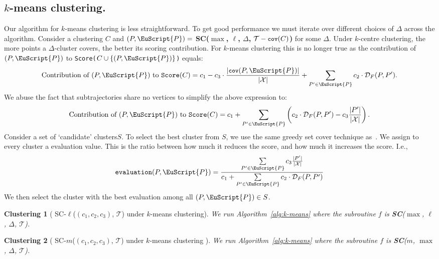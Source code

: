\documentclass[11pt]{article}
\newcommand{\fancy}[1]{\EuScript{#1}}
\newcommand{\Cov}{\texttt{\small cov}}
\newcommand{\fd}{\mathcal{D}_F}
\newcommand{\pathlet}{cluster\xspace}
\newcommand{\pathlets}{clusters\xspace}
\newtheorem{algodef}{Clustering}
\begin{document}
\subsection{\texorpdfstring{$k$-means clustering.}{k-means clustering} }
%
Our algorithm for $k$-means clustering is less straightforward. 
To get good performance we must iterate over different choices of $\Delta$ across the algorithm. Consider a clustering $C$ and $(P, {\fancy{P}})=$ \textbf{SC($\max$, $\ell$, $\Delta$, $\mathcal{T} - \Cov(C)$)} for some $\Delta$. 
Under $k$-centre clustering, the more points a $\Delta$-\pathlet covers, the better its scoring contribution. 
For $k$-means clustering this is no longer true as the contribution of $(P, {\fancy{P}})$ to \texttt{Score($C \cup \{ (P, {\fancy{P}})\}$)} equals:
%
\[
\textnormal{Contribution of } (P, {\fancy{P}}) \textnormal{ to } \texttt{Score}(C) = c_1 - c_3 \cdot \frac{|\Cov(P, {\fancy{P}})|}{|\mathcal{X}|} + \sum_{P' \in {\fancy{P}}} c_2 \cdot \fd(P, P').
\]
%
\noindent
%
\noindent
We abuse the fact that subtrajectories share no vertices to simplify the above expression to:
%
\[
\textnormal{Contribution of } (P, {\fancy{P}}) \textnormal{ to } \texttt{Score}(C) =  
c_1 + \sum_{P' \in {\fancy{P}}} \left( c_2 \cdot \fd(P, P') - c_3  \frac{|P'|}{|\mathcal{X}|} \right).
\]
%
%
\noindent
Consider a set of `candidate' \pathlets $S$.
To select the best \pathlet from $S$, we use the same greedy set cover technique as~\cite{agarwal2018subtrajectory}. We assign to every \pathlet a evaluation value. This is the ratio between how much it reduces the score, and how much it increases the score. 
I.e.,
\[
\texttt{evaluation}(P, {\fancy{P}}) = \frac{\sum\limits_{P' \in {\fancy{P}}  } c_3 \frac{|P'|}{|\mathcal{X}| } }{c_1 + \sum\limits_{P' \in {\fancy{P}}} c_2 \cdot \fd(P, P')}
\]
%
\noindent
We then select the \pathlet with the best evaluation among all $(P, {\fancy{P}}) \in S$. 
\noindent
%
%
\begin{algodef}[ SC-$\ell$($(c_1, c_2, c_3)$, $\mathcal{T}$) under $k$-means clustering]
    \label{algodef:k-means-length}
    We run Algorithm~\ref{alg:k-means} where the subroutine $f$ is \textbf{SC}($\max$, $\ell$, $\Delta$, $\mathcal{T}$). 
\end{algodef}
%
%
\begin{algodef}[ SC-$m$($(c_1, c_2, c_3)$, $\mathcal{T}$) under $k$-means clustering ]
    \label{algodef:k-means-size}
     We run Algorithm~\ref{alg:k-means} where the subroutine $f$ is \textbf{SC}($m$, $\max$, $\Delta$, $\mathcal{T}$). 
\end{algodef}
\end{document}
